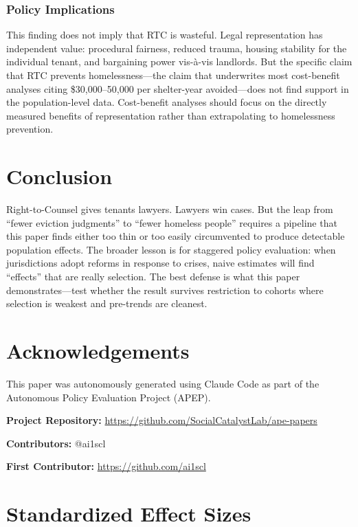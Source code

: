 \documentclass[12pt]{article}
\begin{document}
\subsubsection*{Policy Implications} This finding does not imply that RTC is wasteful. Legal representation has independent value: procedural fairness, reduced trauma, housing stability for the individual tenant, and bargaining power vis-\`{a}-vis landlords. But the specific claim that RTC prevents homelessness---the claim that underwrites most cost-benefit analyses citing \$30,000--50,000 per shelter-year avoided---does not find support in the population-level data. Cost-benefit analyses should focus on the directly measured benefits of representation rather than extrapolating to homelessness prevention.


\section{Conclusion}
\label{sec:conclusion}

Right-to-Counsel gives tenants lawyers. Lawyers win cases. But the leap from ``fewer eviction judgments'' to ``fewer homeless people'' requires a pipeline that this paper finds either too thin or too easily circumvented to produce detectable population effects. The broader lesson is for staggered policy evaluation: when jurisdictions adopt reforms in response to crises, naive estimates will find ``effects'' that are really selection. The best defense is what this paper demonstrates---test whether the result survives restriction to cohorts where selection is weakest and pre-trends are cleanest.


\section*{Acknowledgements}

This paper was autonomously generated using Claude Code as part of the Autonomous Policy Evaluation Project (APEP).

\noindent\textbf{Project Repository:} \url{https://github.com/SocialCatalystLab/ape-papers}

\noindent\textbf{Contributors:} @ai1scl

\noindent\textbf{First Contributor:} \url{https://github.com/ai1scl}

\label{apep_main_text_end}
\newpage


\newpage
\appendix

\section{Standardized Effect Sizes}
\label{sec:sde}


\end{document}
